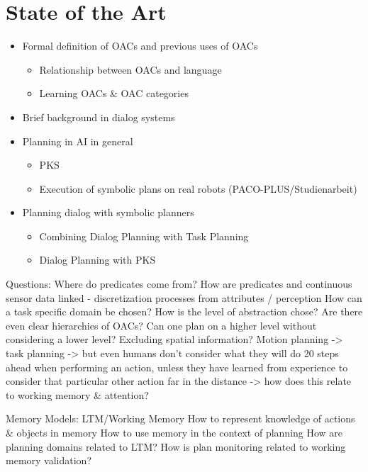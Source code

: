 \documentclass[english,ngerman]{KITreprt}
\begin{document}
\chapter{State of the Art}
\begin{itemize}
    \item Formal definition of OACs and previous uses of OACs
        \begin{itemize}
            \item Relationship between OACs and language
            \item Learning OACs \& OAC categories
        \end{itemize}
    \item Brief background in dialog systems
    \item Planning in AI in general
        \begin{itemize}
            \item PKS
            \item Execution of symbolic plans on real robots (PACO-PLUS/Studienarbeit)
        \end{itemize}
    \item Planning dialog with symbolic planners
        \begin{itemize}
            \item Combining Dialog Planning with Task Planning
            \item Dialog Planning with PKS
        \end{itemize}
\end{itemize}

Questions:
Where do predicates come from?
How are predicates and continuous sensor data linked
  - discretization processes from attributes / perception
How can a task specific domain be chosen?
How is the level of abstraction chose?
Are there even clear hierarchies of OACs?
Can one plan on a higher level without considering a lower level?
Excluding spatial information? Motion planning -> task planning
-> but even humans don't consider what they will do 20 steps ahead when performing an action, unless they have learned from experience to consider that particular other action far in the distance -> how does this relate to working memory \& attention?

Memory Models: LTM/Working Memory
How to represent knowledge of actions \& objects in memory
How to use memory in the context of planning
How are planning domains related to LTM?
How is plan monitoring related to working memory validation?
\end{document}
